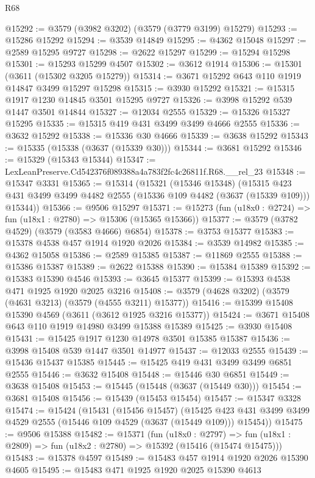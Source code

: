 \begin{lexlean}{R68}
\begin{coremodule}
@15292 := @3579 (@3982 @3202) (@3579 (@3779 @3199) @15279)
@15293 := @15286 @15292
@15294 := @3539 @14849
@15295 := @4362 @15048
@15297 := @2589 @15295 @9727
@15298 := @2622 @15297
@15299 := @15294 @15298
@15301 := @15293 @15299 @4507
@15302 := @3612 @1914
@15306 := @15301 (@3611 (@15302 @3205 @15279))
@15314 := @3671 @15292 @643 @110 @1919 @14847 @3499 @15297 @15298
@15315 := @3930 @15292
@15321 := @15315 @1917 @1230 @14845 @3501 @15295 @9727
@15326 := @3998 @15292 @539 @1447 @3501 @14844
@15327 := @12034 @2555
@15329 := @15326 @15327 @15295
@15335 := @15315 @419 @431 @3499 @3499 @4666 @2555
@15336 := @3632 @15292
@15338 := @15336 @30 @4666
@15339 := @3638 @15292
@15343 := @15335 (@15338 (@3637 (@15339 @30)))
@15344 := @3681 @15292
@15346 := @15329 (@15343 @15344)
@15347 := LexLeanPreserve.Cd542376f089388a4a783f2fc4c26811f.R68.__rel_23
@15348 := @15347 @3331
@15365 := @15314
    (@15321
      (@15346 @15348)
      (@15315 @423 @431 @3499 @3499 @4482 @2555 (@15336 @109 @4482 (@3637 (@15339 @109))) @15344))
@15366 := @9506 @15297
@15371 := @15273 (fun (u18x0 : @2724) => fun (u18x1 : @2780) => @15306 (@15365 @15366))
@15377 := @3579 (@3782 @4529) (@3579 (@3583 @4666) @6854)
@15378 := @3753 @15377
@15383 := @15378 @4538 @457 @1914 @1920 @2026
@15384 := @3539 @14982
@15385 := @4362 @15058
@15386 := @2589 @15385
@15387 := @11869 @2555
@15388 := @15386 @15387
@15389 := @2622 @15388
@15390 := @15384 @15389
@15392 := @15383 @15390 @4546
@15393 := @3645 @15377
@15399 := @15393 @4538 @471 @1925 @1920 @2025 @3216
@15408 := @3579 (@4628 @3202) (@3579 (@4631 @3213) (@3579 (@4555 @3211) @15377))
@15416 := @15399 @15408 @15390 @4569 (@3611 (@3612 @1925 @3216 @15377))
@15424 := @3671 @15408 @643 @110 @1919 @14980 @3499 @15388 @15389
@15425 := @3930 @15408
@15431 := @15425 @1917 @1230 @14978 @3501 @15385 @15387
@15436 := @3998 @15408 @539 @1447 @3501 @14977
@15437 := @12033 @2555
@15439 := @15436 @15437 @15385
@15445 := @15425 @419 @431 @3499 @3499 @6851 @2555
@15446 := @3632 @15408
@15448 := @15446 @30 @6851
@15449 := @3638 @15408
@15453 := @15445 (@15448 (@3637 (@15449 @30)))
@15454 := @3681 @15408
@15456 := @15439 (@15453 @15454)
@15457 := @15347 @3328
@15474 := @15424
    (@15431
      (@15456 @15457)
      (@15425 @423 @431 @3499 @3499 @4529 @2555 (@15446 @109 @4529 (@3637 (@15449 @109))) @15454))
@15475 := @9506 @15388
@15482 := @15371
    (fun (u18x0 : @2797) =>
    fun (u18x1 : @2809) => fun (u18x2 : @2780) => @15392 (@15416 (@15474 @15475)))
@15483 := @15378 @4597
@15489 := @15483 @457 @1914 @1920 @2026 @15390 @4605
@15495 := @15483 @471 @1925 @1920 @2025 @15390 @4613

\end{coremodule}
\end{lexlean}

